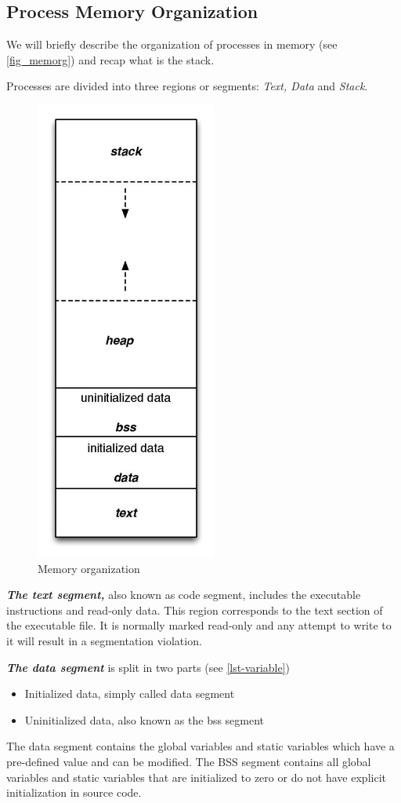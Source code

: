\documentclass[10pt,twocolumn]{article}
\begin{document}
\subsection{Process Memory Organization} 
We will briefly describe the
organization of processes in memory (see \autoref{fig_memorg}) and recap what is the stack. 

Processes are divided into three regions or segments: \textit{Text, Data} and
\textit{Stack}.

\begin{figure}[h]
  \centering
  \includegraphics[scale=.85]{./graphics/memory_organization.jpg}
  \caption{Memory organization}
  \label{fig_memorg}
\end{figure}

\textbf{\textit{The text segment,}} also known as code segment, includes the
executable instructions and read-only data. This region corresponds to the text
section of the executable file. It is normally marked read-only and any attempt
to write to it will result in a segmentation violation.

\textbf{\textit{The data segment}} is split in two parts (see
\autoref{lst-variable})
\begin{itemize}
\item Initialized data, simply called data segment
\item Uninitialized data, also known as the bss segment
\end{itemize}
    The data segment contains the global variables and static variables
which have a pre-defined value and can be modified. The BSS segment contains
all global variables and static variables that are initialized to zero or do
not have explicit initialization in source code.
\end{document}
